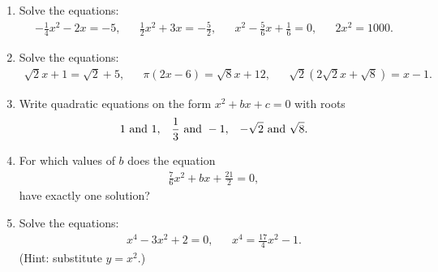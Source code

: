 \begin{enumerate}
\item Solve the equations:
\begin{align*}
-\frac{1}{4}x^2-2x=-5,&& \frac{1}{2}x^2+3x=-\frac{5}{2},&& x^2-\frac{5}{6}x+\frac{1}{6}=0,&& 2x^2=1000.
\end{align*}



\item Solve the equations:
\begin{align*}
\sqrt{2}x+1=\sqrt{2}+5,&& \pi(2x-6)=\sqrt{8}x+12,&& \sqrt{2}(2\sqrt{2}x+\sqrt{8})=x-1.
\end{align*}

	\item 	Write quadratic equations on the form $x^2+bx+c=0$ with roots
	\begin{align*}
	1 \textup{ and } 1,&& \frac{1}{3} \textup{ and } -1,&&  -\sqrt{2} \textup{ and } \sqrt{8}.
	\end{align*}
	
	
	\item For which values of $b$ does the equation
	\begin{align*}
	\frac{7}{6}x^2+bx+\frac{21}{2}=0,
	\end{align*}
	have exactly one solution?
	
	
	\item Solve the equations:
	\begin{align*}
	x^4-3x^2+2=0,&& x^4=\frac{17}{4}x^2-1.
	\end{align*}
	(Hint: substitute $y=x^2$.)
	

	
\end{enumerate}